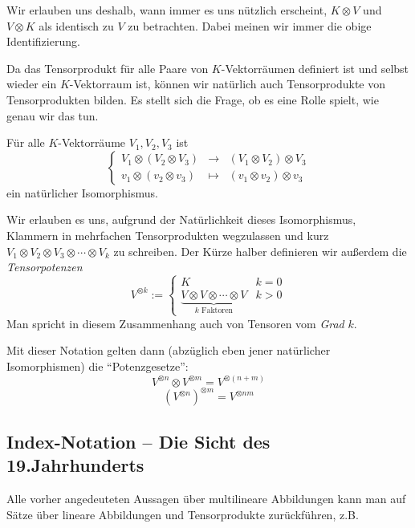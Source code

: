 \begin{remark}
Wir erlauben uns deshalb, wann immer es uns nützlich erscheint, $K\otimes V$ und $V\otimes K$ als identisch zu $V$ zu betrachten. Dabei meinen wir immer die obige Identifizierung.
\end{remark}

\begin{remark}
Da das Tensorprodukt für alle Paare von $K$-Vektorräumen definiert ist und selbst wieder ein $K$-Vektorraum ist, können wir natürlich auch Tensorprodukte von Tensorprodukten bilden. Es stellt sich die Frage, ob es eine Rolle spielt, wie genau wir das tun.
\end{remark}

\begin{lemmadef}
Für alle $K$-Vektorräume $V_1, V_2, V_3$ ist
\[\left\lbrace\begin{array}{rcl}
V_1\otimes(V_2\otimes V_3) &\to& (V_1\otimes V_2)\otimes V_3 \\
v_1\otimes (v_2\otimes v_3) &\mapsto& (v_1\otimes v_2)\otimes v_3
\end{array}\right.\]
ein natürlicher Isomorphismus.

Wir erlauben es uns, aufgrund der Natürlichkeit dieses Isomorphismus, Klammern in mehrfachen Tensorprodukten wegzulassen und kurz $V_1\otimes V_2\otimes V_3\otimes\cdots\otimes V_k$ zu schreiben. Der Kürze halber definieren wir außerdem die \emph{Tensorpotenzen}
\[V^{\otimes k} := \begin{cases} K & k=0 \\ 
\underbrace{V\otimes V\otimes\cdots\otimes V}_{k\text{ Faktoren}} & k>0\end{cases}\]
Man spricht in diesem Zusammenhang auch von Tensoren vom \emph{Grad} $k$.
\end{lemmadef}

\begin{remark}
Mit dieser Notation gelten dann (abzüglich eben jener natürlicher Isomorphismen) die \enquote{Potenzgesetze}:
\[V^{\otimes n}\otimes V^{\otimes m} = V^{\otimes(n+m)}\]
\[(V^{\otimes n})^{\otimes m} = V^{\otimes nm}\]
\end{remark}

\subsection{Index-Notation -- Die Sicht des 19.Jahrhunderts}

\begin{remark}
Alle vorher angedeuteten Aussagen über multilineare Abbildungen kann man auf Sätze über lineare Abbildungen und Tensorprodukte zurückführen, z.B.
\end{remark}

